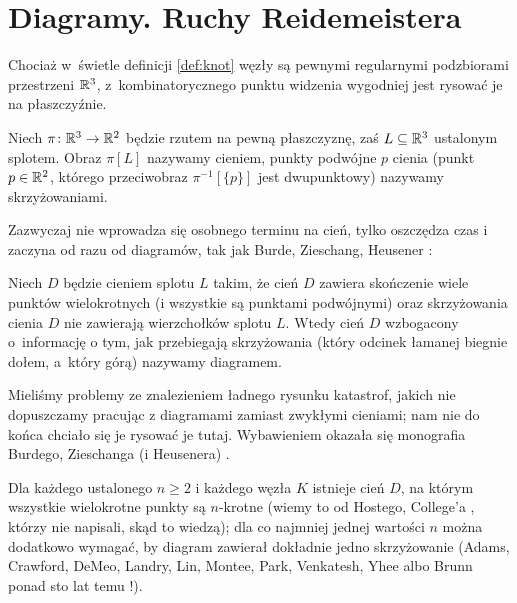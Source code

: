 
\section{Diagramy. Ruchy Reidemeistera}

Chociaż w~świetle definicji \ref{def:knot} węzły są pewnymi regularnymi podzbiorami przestrzeni $\mathbb R^3$, z~kombinatorycznego punktu widzenia wygodniej jest rysować je na płaszczyźnie.

\begin{definition}
%
%  
\label{def:crossing}%
    Niech $\pi \colon \mathbb R^3 \to \mathbb R^2$ będzie rzutem na pewną płaszczyznę, zaś $L \subseteq \mathbb R^3$ ustalonym splotem.
    Obraz $\pi[L]$ nazywamy cieniem, punkty podwójne $p$ cienia (punkt $p \in \mathbb R^2$, którego przeciwobraz $\pi^{-1}[\{p\}]$ jest dwupunktowy) nazywamy skrzyżowaniami.
\end{definition}

Zazwyczaj nie wprowadza się osobnego terminu na cień, tylko oszczędza czas i zaczyna od razu od diagramów, tak jak Burde, Zieschang, Heusener \cite[s. 9]{burde2014}:

\begin{definition}[diagram]
%
    Niech $D$ będzie cieniem splotu $L$ takim, że cień $D$ zawiera skończenie wiele punktów wielokrotnych (i wszystkie są punktami podwójnymi) oraz skrzyżowania cienia $D$ nie zawierają wierzchołków splotu $L$.
    Wtedy cień $D$ wzbogacony o~informację o tym, jak przebiegają skrzyżowania (który odcinek łamanej biegnie dołem, a~który górą) nazywamy diagramem.
%
%
\end{definition}

Mieliśmy problemy ze znalezieniem ładnego rysunku katastrof, jakich nie dopuszczamy pracując z diagramami zamiast zwykłymi cieniami; nam nie do końca chciało się je rysować je tutaj.
Wybawieniem okazała się monografia Burdego, Zieschanga (i Heusenera) \cite[s. 9]{burde2014}.

Dla każdego ustalonego $n \ge 2$ i każdego węzła $K$ istnieje cień $D$, na którym wszystkie wielokrotne punkty są $n$-krotne (wiemy to od Hostego, College'a \cite[s. 11]{adams2021}, którzy nie napisali, skąd to wiedzą);
%
%
dla co najmniej jednej wartości $n$ można dodatkowo wymagać, by diagram zawierał dokładnie jedno skrzyżowanie (Adams, Crawford, DeMeo, Landry, Lin, Montee, Park, Venkatesh, Yhee \cite{venkatesh2015} albo Brunn ponad sto lat temu \cite[s. 28]{adams2021}!).
%
%
%
%
%
%
%
%


